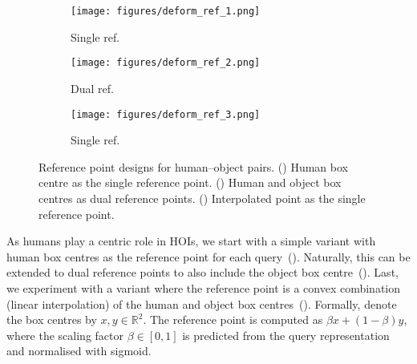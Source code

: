 \documentclass[10pt,twocolumn,letterpaper]{article}
\begin{document}
\begin{figure}
   \begin{subfigure}[t]{0.326\linewidth}
      \centering
      \texttt{[image: figures/deform\_ref\_1.png]}
      \caption{Single ref.}
      \label{fig:defm_ref_1}
   \end{subfigure}
   \hfill
   \begin{subfigure}[t]{0.326\linewidth}
      \centering
      \texttt{[image: figures/deform\_ref\_2.png]}
      \caption{Dual ref.}
      \label{fig:defm_ref_2}
   \end{subfigure}
   \hfill
   \begin{subfigure}[t]{0.326\linewidth}
      \centering
      \texttt{[image: figures/deform\_ref\_3.png]}
      \caption{Single ref.}
      \label{fig:defm_ref_3}
   \end{subfigure}
   \vspace{1px}
   \caption{Reference point designs for human--object pairs. () Human box centre as the single reference point. () Human and object box centres as dual reference points. () Interpolated point as the single reference point.}
   \label{fig:defm_ref}
\end{figure}

As humans play a centric role in HOIs, we start with a simple variant with human box centres as the reference point for each query~(). Naturally, this can be extended to dual reference points to also include the object box centre~(). Last, we experiment with a variant where the reference point is a convex combination (linear interpolation) of the human and object box centres~(). Formally, denote the box centres by $x, y \in \mathbb{R}^2$. The reference point is computed as $\beta x + (1 - \beta) y$, where the scaling factor $\beta \in [0, 1]$ is predicted from the query representation and normalised with sigmoid.
\end{document}
